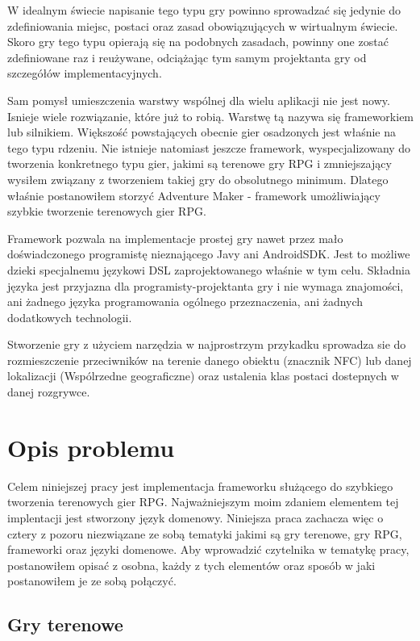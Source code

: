 \documentclass	{xmgr}
\begin{document}
W idealnym świecie napisanie tego typu gry powinno sprowadzać się jedynie do zdefiniowania miejsc, postaci oraz zasad obowiązujących w wirtualnym świecie.
Skoro gry tego typu opierają się na podobnych zasadach, powinny one zostać zdefiniowane raz i reużywane, odciążając tym samym projektanta gry od szczegółów implementacyjnych. 

Sam pomysł umieszczenia warstwy wspólnej dla wielu aplikacji nie jest nowy. Isnieje wiele rozwiązanie, które już to robią. Warstwę tą nazywa się frameworkiem lub silnikiem. Większość powstających obecnie gier osadzonych jest właśnie na tego typu rdzeniu. 
Nie istnieje natomiast jeszcze framework, wyspecjalizowany do tworzenia konkretnego typu gier, jakimi są terenowe gry RPG i zmniejszający wysiłem związany z tworzeniem takiej gry do obsolutnego minimum. Dlatego właśnie postanowiłem storzyć Adventure Maker - framework umożliwiający szybkie tworzenie terenowych gier RPG. 

Framework pozwala na implementacje prostej gry nawet przez mało doświadczonego programistę nieznającego Javy ani AndroidSDK. Jest to możliwe dzieki specjalnemu językowi DSL zaprojektowanego właśnie w tym celu. Składnia języka jest przyjazna dla programisty-projektanta gry i nie wymaga znajomości, ani żadnego języka programowania ogólnego przeznaczenia, ani żadnych dodatkowych technologii.

Stworzenie gry z użyciem narzędzia w najprostrzym przykadku sprowadza sie do rozmieszczenie przeciwników na terenie danego obiektu (znacznik NFC) lub danej lokalizacji (Wspólrzedne geograficzne) oraz ustalenia klas postaci dostepnych w danej rozgrywce.

\chapter{Opis problemu}

Celem niniejszej pracy jest implementacja frameworku służącego do szybkiego tworzenia terenowych gier RPG. Najważniejszym moim zdaniem elementem tej implentacji jest stworzony język domenowy. Niniejsza praca zachacza więc o cztery z pozoru niezwiązane ze sobą tematyki jakimi są gry terenowe, gry RPG, frameworki oraz języki domenowe. Aby wprowadzić czytelnika w tematykę pracy, postanowiłem opisać z osobna, każdy z  tych elementów oraz sposób w jaki postanowiłem je ze sobą połączyć.  

\section{Gry terenowe}
\end{document}
